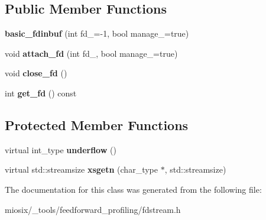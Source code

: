 \subsection*{Public Member Functions}
\begin{DoxyCompactItemize}
\item 
\hypertarget{classbasic__fdinbuf_aa6e1fc51d9bd6e109e614d101a1ab720}{{\bfseries basic\-\_\-fdinbuf} (int fd\-\_\-=-\/1, bool manage\-\_\-=true)}\label{classbasic__fdinbuf_aa6e1fc51d9bd6e109e614d101a1ab720}

\item 
\hypertarget{classbasic__fdinbuf_a45a20be67f6c7ad47a83ce198b52da22}{void {\bfseries attach\-\_\-fd} (int fd\-\_\-, bool manage\-\_\-=true)}\label{classbasic__fdinbuf_a45a20be67f6c7ad47a83ce198b52da22}

\item 
\hypertarget{classbasic__fdinbuf_a3ebf193fc818e4b49b99a91ee3fffaa3}{void {\bfseries close\-\_\-fd} ()}\label{classbasic__fdinbuf_a3ebf193fc818e4b49b99a91ee3fffaa3}

\item 
\hypertarget{classbasic__fdinbuf_a2df50b88df6d2c6804beb60e7a1dad8c}{int {\bfseries get\-\_\-fd} () const }\label{classbasic__fdinbuf_a2df50b88df6d2c6804beb60e7a1dad8c}

\end{DoxyCompactItemize}
\subsection*{Protected Member Functions}
\begin{DoxyCompactItemize}
\item 
\hypertarget{classbasic__fdinbuf_a7487240718252bc918163d64c79ad28a}{virtual int\-\_\-type {\bfseries underflow} ()}\label{classbasic__fdinbuf_a7487240718252bc918163d64c79ad28a}

\item 
\hypertarget{classbasic__fdinbuf_a9e15e61d9568c8cd77c28cdf3f2441d2}{virtual std\-::streamsize {\bfseries xsgetn} (char\-\_\-type $\ast$, std\-::streamsize)}\label{classbasic__fdinbuf_a9e15e61d9568c8cd77c28cdf3f2441d2}

\end{DoxyCompactItemize}


The documentation for this class was generated from the following file\-:\begin{DoxyCompactItemize}
\item 
miosix/\-\_\-tools/feedforward\-\_\-profiling/fdstream.\-h\end{DoxyCompactItemize}
